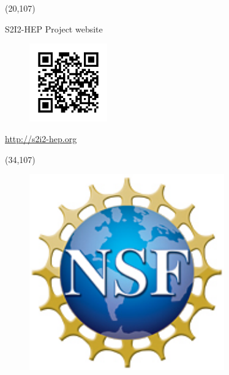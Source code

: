 \documentclass[final]{beamer}
\begin{document}
\begin{frame}{}
\begin{textblock}{14.0}(20,107)
\begin{block}{S2I2-HEP Project website}
\begin{figure}[tbph]
\centering
\includegraphics[width=0.30\textwidth]{images/qr-s2i2-hep.png}
\end{figure}
\begin{center}
\url{http://s2i2-hep.org}
\end{center}
\end{block}
\end{textblock}

\begin{textblock}{10.0}(34,107)
\begin{figure}[tbph]
\centering
\includegraphics[width=0.75\textwidth]{images/nsf1.jpg}
\end{figure}
\end{textblock}






\end{frame}
\end{document}
